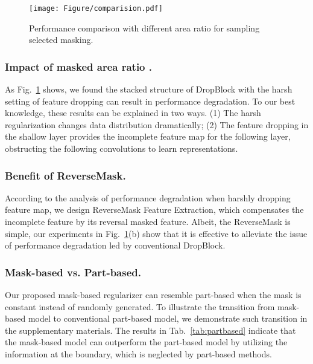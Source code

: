\documentclass[runningheads]{llncs}
\begin{document}
\begin{figure}[t!]
\centering
\texttt{[image: Figure/comparision.pdf]}
\centering
\caption{
Performance comparison with different area ratio for sampling selected masking. 
}
\label{fig:comparisionblock}
\vspace{-5mm}
\end{figure}

\subsubsection{Impact of masked area ratio .} As Fig.~\ref{fig:comparisionblock} shows, we found the stacked structure of DropBlock with the harsh setting of feature dropping can result in performance degradation. To our best knowledge, these results can be explained in two ways. (1) The harsh regularization changes data distribution dramatically; (2) The feature dropping in the shallow layer provides the incomplete feature map for the following layer, obstructing the following convolutions to learn representations. 

\subsubsection{Benefit of ReverseMask.} According to the analysis of performance degradation when harshly dropping feature map, we design ReverseMask Feature Extraction, which compensates the incomplete feature by its reversal masked feature. Albeit, the ReverseMask is simple, our experiments in Fig.~\ref{fig:comparisionblock}(b) show that it is effective to alleviate the issue of performance degradation led by conventional DropBlock.

\subsubsection{Mask-based vs. Part-based.} Our proposed mask-based regularizer can resemble part-based when the mask is constant instead of randomly generated. To illustrate the transition from mask-based model to conventional part-based model, we demonstrate such transition in the supplementary materials. The results in Tab.~\ref{tab:partbased} indicate that the mask-based model can outperform the part-based model by utilizing the information at the boundary, which is neglected by part-based methods.
\end{document}
